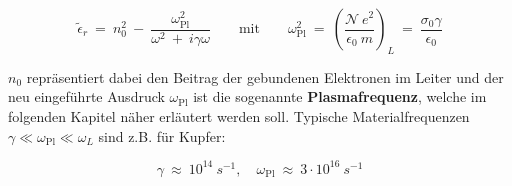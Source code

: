 \begin{equation*}
\tilde{\epsilon}_r \ = \ n_0^2 \ - \ \frac{\omega_{\text{Pl}}^2}{\omega^2 \ + \ i\gamma\omega} \qquad \text{mit}\qquad \omega_{\text{Pl}}^2  \ = \  \left(\frac{\mathcal{N}\ e^2}{\epsilon_0 \ m}\right)_L \ = \ \frac{\sigma_0\gamma}{\epsilon_0}
\end{equation*}

$n_0$ repräsentiert dabei den Beitrag der gebundenen Elektronen im Leiter und der neu eingeführte Ausdruck $\omega_{\text{Pl}}$ ist die sogenannte \textbf{Plasmafrequenz}, welche im folgenden Kapitel näher erläutert werden soll. Typische Materialfrequenzen $\gamma\ll\omega_{\text{Pl}}\ll\omega_L$ sind z.B. für Kupfer:

\begin{equation*}
\gamma \ \approx \ 10^{14} \ s^{-1}, \quad \omega_{\text{Pl}} \ \approx \ 3\cdot 10^{16} \ s^{-1}
\end{equation*}

